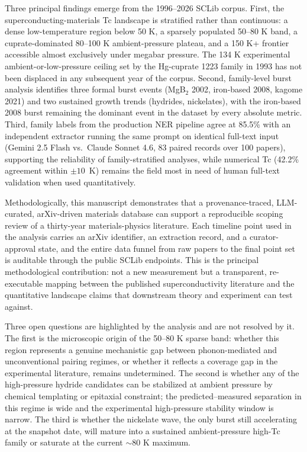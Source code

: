 \documentclass[11pt]{article}
\begin{document}
Three principal findings emerge from the 1996--2026 SCLib corpus. First, the superconducting-materials Tc landscape is stratified rather than continuous: a dense low-temperature region below 50 K, a sparsely populated 50--80 K band, a cuprate-dominated 80--100 K ambient-pressure plateau, and a 150 K+ frontier accessible almost exclusively under megabar pressure. The 134 K experimental ambient-or-low-pressure ceiling set by the Hg-cuprate 1223 family in 1993 has not been displaced in any subsequent year of the corpus. Second, family-level burst analysis identifies three formal burst events (MgB$_2$ 2002, iron-based 2008, kagome 2021) and two sustained growth trends (hydrides, nickelates), with the iron-based 2008 burst remaining the dominant event in the dataset by every absolute metric. Third, family labels from the production NER pipeline agree at 85.5\% with an independent extractor running the same prompt on identical full-text input (Gemini 2.5 Flash vs.\ Claude Sonnet 4.6, 83 paired records over 100 papers), supporting the reliability of family-stratified analyses, while numerical Tc (42.2\% agreement within $\pm 10$~K) remains the field most in need of human full-text validation when used quantitatively.

Methodologically, this manuscript demonstrates that a provenance-traced, LLM-curated, arXiv-driven materials database can support a reproducible scoping review of a thirty-year materials-physics literature. Each timeline point used in the analysis carries an arXiv identifier, an extraction record, and a curator-approval state, and the entire data funnel from raw papers to the final point set is auditable through the public SCLib endpoints. This is the principal methodological contribution: not a new measurement but a transparent, re-executable mapping between the published superconductivity literature and the quantitative landscape claims that downstream theory and experiment can test against.

Three open questions are highlighted by the analysis and are not resolved by it. The first is the microscopic origin of the 50--80 K sparse band: whether this region represents a genuine mechanistic gap between phonon-mediated and unconventional pairing regimes, or whether it reflects a coverage gap in the experimental literature, remains undetermined. The second is whether any of the high-pressure hydride candidates can be stabilized at ambient pressure by chemical templating or epitaxial constraint; the predicted--measured separation in this regime is wide and the experimental high-pressure stability window is narrow. The third is whether the nickelate wave, the only burst still accelerating at the snapshot date, will mature into a sustained ambient-pressure high-Tc family or saturate at the current $\sim$80 K maximum.
\end{document}
